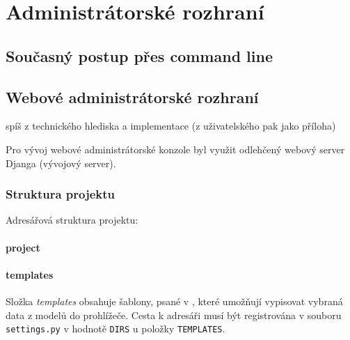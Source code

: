 \chapter{Administrátorské rozhraní}
\label{4-praxe}

\section{Současný postup přes command line}


\section{Webové administrátorské rozhraní}
spíš z technického hlediska a implementace
(z uživatelského pak jako příloha)

Pro vývoj webové administrátorské konzole byl využit odlehčený webový server Djanga (vývojový server).

\subsection{Struktura projektu}
Adresářová struktura projektu:


\subsubsection{project}

\subsubsection{templates}
Složka \textit{templates} obsahuje šablony, psané v , které umožňují vypisovat vybraná data z modelů do prohlížeče. Cesta k adresáři musí být registrována v souboru \texttt{settings.py} v hodnotě \texttt{DIRS} u položky \texttt{TEMPLATES}.


